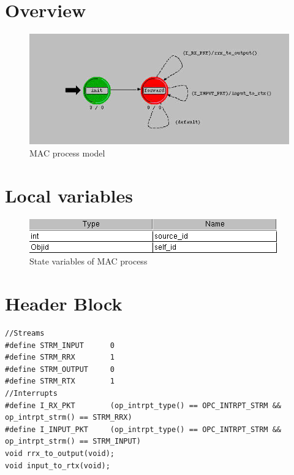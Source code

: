 

\section{Overview}
\begin{figure}[ht]
    \centering
    \includegraphics[width=.7\textwidth]{images/mac}
    \caption{MAC process model}
    \label{fig:appendix-d}
\end{figure}

\newpage

\section{Local variables}
\begin{figure}[ht]
    \centering
    \includegraphics[width=.7\textwidth]{images/state_variable_mac}
    \caption{State variables of MAC process}
    \label{fig:appendix-d_sv}
\end{figure}

\section{Header Block}
{\tiny
\begin{verbatim}
//Streams
#define STRM_INPUT		0
#define STRM_RRX		1
#define STRM_OUTPUT 	0
#define STRM_RTX		1
//Interrupts
#define I_RX_PKT		(op_intrpt_type() == OPC_INTRPT_STRM && op_intrpt_strm() == STRM_RRX)
#define I_INPUT_PKT		(op_intrpt_type() == OPC_INTRPT_STRM && op_intrpt_strm() == STRM_INPUT)
void rrx_to_output(void);
void input_to_rtx(void);

\end{verbatim}
}

